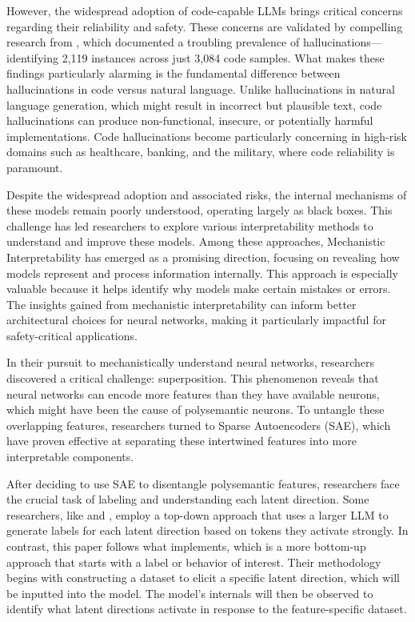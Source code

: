 \documentclass[11pt]{article}
\begin{document}
However, the widespread adoption of code-capable LLMs brings critical concerns regarding their reliability and safety. These concerns are validated by compelling research from \citet{liu2024exploring}, which documented a troubling prevalence of hallucinations—identifying 2,119 instances across just 3,084 code samples. What makes these findings particularly alarming is the fundamental difference between hallucinations in code versus natural language. Unlike hallucinations in natural language generation, which might result in incorrect but plausible text, code hallucinations can produce non-functional, insecure, or potentially harmful implementations. Code hallucinations become particularly concerning in high-risk domains such as healthcare, banking, and the military, where code reliability is paramount.

Despite the widespread adoption and associated risks, the internal mechanisms of these models remain poorly understood, operating largely as black boxes. This challenge has led researchers to explore various interpretability methods to understand and improve these models. Among these approaches, Mechanistic Interpretability has emerged as a promising direction, focusing on revealing how models represent and process information internally. This approach is especially valuable because it helps identify why models make certain mistakes or errors. The insights gained from mechanistic interpretability can inform better architectural choices for neural networks, making it particularly impactful for safety-critical applications.

In their pursuit to mechanistically understand neural networks, researchers discovered a critical challenge: superposition. This phenomenon reveals that neural networks can encode more features than they have available neurons, which might have been the cause of polysemantic neurons. To untangle these overlapping features, researchers turned to Sparse Autoencoders (SAE), which have proven effective at separating these intertwined features into more interpretable components.

After deciding to use SAE to disentangle polysemantic features, researchers face the crucial task of labeling and understanding each latent direction. Some researchers, like \citet{bricken2023monosemanticity} and \citet{templeton2024scaling}, employ a top-down approach that uses a larger LLM to generate labels for each latent direction based on tokens they activate strongly. In contrast, this paper follows what \citet{ferrando2024know} implements, which is a more bottom-up approach that starts with a label or behavior of interest. Their methodology begins with constructing a dataset to elicit a specific latent direction, which will be inputted into the model. The model's internals will then be observed to identify what latent directions activate in response to the feature-specific dataset. 
\end{document}
